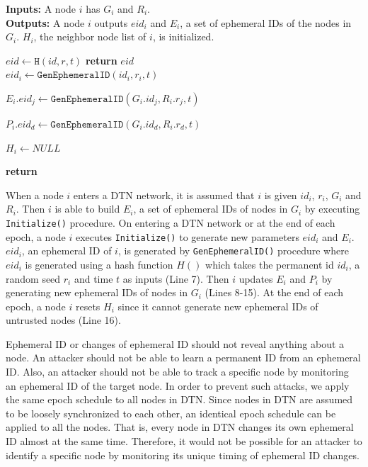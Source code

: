 \documentclass[11pt]{article}
\begin{document}
\begin{framed}
\noindent
\textbf{Inputs:} A node $i$ has $G_i$ and $R_i$. \\

\noindent
\textbf{Outputs:} A node $i$ outputs $eid_i$ and $E_i$, a set of ephemeral IDs of the nodes in $G_i$.  $H_i$, the neighbor node list of $i$, is initialized. \\

\begin{algorithmic}[1]
    \State $eid \leftarrow \texttt{H}(id, r, t)$
    \State \textbf{return} $eid$
  \EndProcedure\\

    \State $eid_i \leftarrow \texttt{GenEphemeralID}(id_i, r_i, t)$

	  \State $E_i.eid_j \leftarrow \texttt{GenEphemeralID}(G_i.id_j, R_i.r_j, t)$
	\EndFor

	    \State $P_i.eid_d \leftarrow \texttt{GenEphemeralID}(G_i.id_d, R_i.r_d, t)$
	  \EndIf
	\EndFor

	
	\State $H_i \leftarrow NULL$
    
    \State \textbf{return}  
  \EndProcedure  
\end{algorithmic}
\end{framed}

When a node $i$ enters a DTN network, it is assumed that $i$ is given $id_i$, $r_i$, $G_i$ and  $R_i$.  
Then $i$ is able to build $E_i$, a set of ephemeral IDs of nodes in $G_i$ by executing \texttt{Initialize()} procedure.  
On entering a DTN network or at the end of each epoch, a node $i$ executes \texttt{Initialize()} to generate new parameters $eid_i$ and $E_i$.  
$eid_i$, an ephemeral ID of $i$, is generated by \texttt{GenEphemeralID()} procedure where $eid_i$ is generated using a hash function $H()$ which takes the permanent id $id_i$, a random seed $r_i$ and time $t$ as inputs (Line 7). 
Then $i$ updates $E_i$ and $P_i$ by generating new ephemeral IDs of nodes in $G_i$ (Lines 8-15).
At the end of each epoch, a node $i$ resets $H_i$ since it cannot generate new ephemeral IDs of untrusted nodes (Line 16).


Ephemeral ID or changes of ephemeral ID should not reveal anything about a node. 
An attacker should not be able to learn a permanent ID from an ephemeral ID. Also, an attacker should not be able to track a specific node by monitoring an ephemeral ID of the target node. 
In order to prevent such attacks, we apply the same epoch schedule to all nodes in DTN. 
Since nodes in DTN are assumed to be loosely synchronized to each other, an identical epoch schedule can be applied to all the nodes. 
That is, every node in DTN changes its own ephemeral ID almost at the same
time. 
Therefore, it would not be possible for an attacker to identify a specific node by monitoring its unique timing of ephemeral ID changes.
\end{document}
